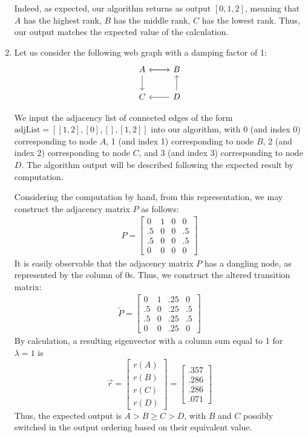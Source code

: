 \documentclass{article}
\begin{document}
\begin{enumerate}
        Indeed, as expected, our algorithm returns as output $[0, 1, 2]$, meaning that $A$ has the highest rank, $B$ has the middle rank, $C$ has the lowest rank. Thus, our output matches the expected value of the calculation.
        
        \item Let us consider the following web graph with a damping factor of 1: 
        $$
        \begin{tikzcd}
            A \arrow[r] \arrow[d]
            & B \arrow[l] \\
            C 
            & D \arrow[l] \arrow[u]
        \end{tikzcd}
        $$
        
        We input the adjacency list of connected edges of the form $\text{adjList} = [[1, 2],[0],[],[1, 2]]$ into our algorithm, with 0 (and index 0) corresponding to node $A$, 1 (and index 1) corresponding to node $B$, 2 (and index 2) corresponding to node $C$, and 3 (and index 3) corresponding to node $D$. The algorithm output will be described following the expected result by computation.
        
        Considering the computation by hand, from this representation, we may construct the adjacency matrix $P$ as follows:
        \begin{align*}
            P = \begin{bmatrix} 0 & 1 & 0 & 0 \\ .5 & 0 & 0 & .5 \\ .5 & 0 & 0 & .5 \\  0 & 0 & 0 & 0\end{bmatrix}
        \end{align*}
        It is easily observable that the adjacency matrix $P$ has a dangling node, as represented by the column of 0s. Thus, we construct the altered transition matrix:
        \begin{align*}
            \widetilde{P} = \begin{bmatrix} 0 & 1 & .25 & 0 \\ .5 & 0 & .25 & .5 \\ .5 & 0 & .25 & .5 \\  0 & 0 & .25 & 0\end{bmatrix}
        \end{align*}
        By calculation, a resulting eigenvector with a column sum equal to 1 for $\lambda = 1$ is $$\vec{r} = \begin{bmatrix} r(A) \\ r(B) \\ r(C) \\ r(D) \end{bmatrix} = \begin{bmatrix} .357 \\ .286 \\ .286 \\.071 \end{bmatrix}$$
        Thus, the expected output is $A > B \geq C > D$, with $B$ and $C$ possibly switched in the output ordering based on their equivalent value.
        

\end{enumerate}
\end{document}
